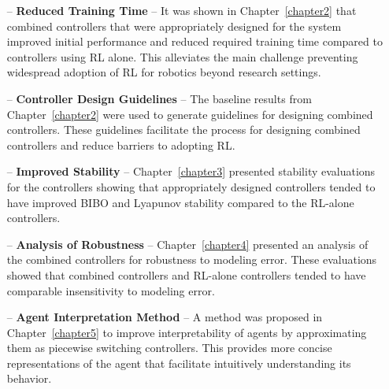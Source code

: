 %
%
\begin{itemize}
    \item[--] \textbf{Reduced Training Time} -- It was shown in Chapter~\ref{chapter2} that combined controllers that were appropriately designed for the system improved initial performance and reduced required training time compared to controllers using RL alone. This alleviates the main challenge preventing widespread adoption of RL for robotics beyond research settings.
    \item[--] \textbf{Controller Design Guidelines} -- The baseline results from Chapter~\ref{chapter2} were used to generate guidelines for designing combined controllers. These guidelines facilitate the process for designing combined controllers and reduce barriers to adopting RL.
    \item[--] \textbf{Improved Stability} -- Chapter~\ref{chapter3} presented stability evaluations for the controllers showing that appropriately designed controllers tended to have improved BIBO and Lyapunov stability compared to the RL-alone controllers.
    \item[--] \textbf{Analysis of Robustness} -- Chapter~\ref{chapter4} presented an analysis of the combined controllers for robustness to modeling error. These evaluations showed that combined controllers and RL-alone controllers tended to have comparable insensitivity to modeling error.
    \item[--] \textbf{Agent Interpretation Method} -- A method was proposed in Chapter~\ref{chapter5} to improve interpretability of agents by approximating them as piecewise switching controllers. This provides more concise representations of the agent that facilitate intuitively understanding its behavior.
\end{itemize}


